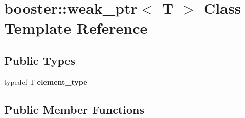 \section{booster\+:\+:weak\+\_\+ptr$<$ T $>$ Class Template Reference}
\label{classbooster_1_1weak__ptr}
\subsection*{Public Types}
\begin{DoxyCompactItemize}
\item 
typedef T {\bfseries element\+\_\+type}\label{classbooster_1_1weak__ptr_a07c8444ff0fcb1e509436c32728e6268}

\end{DoxyCompactItemize}
\subsection*{Public Member Functions}
